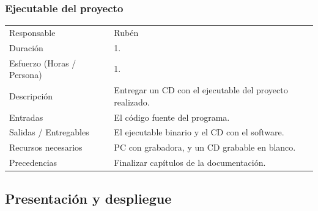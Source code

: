 \subsubsection{Ejecutable del proyecto}
\begin{table}[H]
    \begin{center}
        \begin{tabular}{l p{8cm}}
            Responsable                           & Rub\'{e}n \\
            Duraci\'{o}n                          & 1. \\ 
            Esfuerzo (Horas / Persona)            & 1. \\
            Descripci\'{o}n                       & Entregar un CD con el ejecutable del proyecto realizado. \\
            Entradas                              & El c\'{o}digo fuente del programa. \\
            Salidas / Entregables                 & El ejecutable binario y el CD con el software. \\
            Recursos necesarios                   & PC con grabadora, y un CD grabable en blanco. \\
            Precedencias                          & Finalizar cap\'{i}tulos de la documentaci\'{o}n. \\
        \end{tabular}
    \end{center}
    
\end{table}

\subsection{Presentaci\'{o}n y despliegue}
